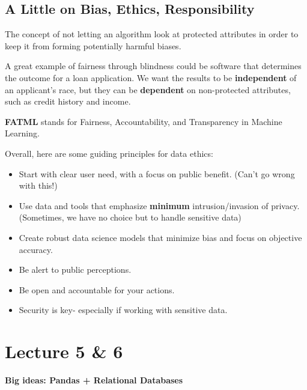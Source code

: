 \documentclass[english, 10pt]{article}
\begin{document}
\subsection{A Little on Bias, Ethics, Responsibility}

\begin{tcolorbox}[title=Aside: Fairness Through Blindness,colframe=black,colback=white,arc=0pt,fonttitle=\bfseries]
The concept of not letting an algorithm look at protected attributes in order to keep it from forming potentially harmful biases.
\end{tcolorbox}

\hfill \break A great example of fairness through blindness could be software that determines the outcome for a loan application. We want the results to be \textbf{independent} of an applicant's race, but they can be \textbf{dependent} on non-protected attributes, such as credit history and income.\\

\begin{tcolorbox}[title=Aside: FATML,colframe=black,colback=white,arc=0pt,fonttitle=\bfseries]
\textbf{FATML} stands for Fairness, Accountability, and Transparency in Machine Learning.
\end{tcolorbox}

\hfill \break Overall, here are some guiding principles for data ethics:

\begin{itemize}
	\item Start with clear user need, with a focus on public benefit. (Can't go wrong with this!)
	\item Use data and tools that emphasize \textbf{minimum} intrusion/invasion of privacy. (Sometimes, we have no choice but to handle sensitive data)
	\item Create robust data science models that minimize bias and focus on objective accuracy.
	\item Be alert to public perceptions.
	\item Be open and accountable for your actions.
	\item Security is key- especially if working with sensitive data.
\end{itemize}

\section{Lecture 5 \& 6}

\textbf{Big ideas: Pandas + Relational Databases}
\end{document}
